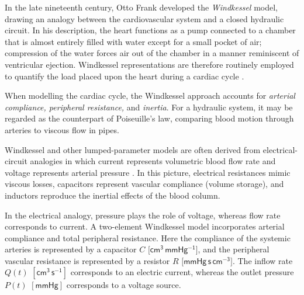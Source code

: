 \documentclass[alpha-refs, 12pt]{wiley-article}
\begin{document}
In the late nineteenth century, Otto Frank developed the \emph{Windkessel} model, drawing an analogy between the cardiovascular system and a closed hydraulic circuit. In his description, the heart functions as a pump connected to a chamber that is almost entirely filled with water except for a small pocket of air; compression of the water forces air out of the chamber in a manner reminiscent of ventricular ejection. Windkessel representations are therefore routinely employed to quantify the load placed upon the heart during a cardiac cycle \cite{Catanho2012}.

When modelling the cardiac cycle, the Windkessel approach accounts for \emph{arterial compliance, peripheral resistance,} and \emph{inertia}. For a hydraulic system, it may be regarded as the counterpart of Poiseuille's law, comparing blood motion through arteries to viscous flow in pipes.

Windkessel and other lumped-parameter models are often derived from electrical-circuit analogies in which current represents volumetric blood flow rate and voltage represents arterial pressure \cite{Avolio1980, Segers1998, Milisic2004}. In this picture, electrical resistances mimic viscous losses, capacitors represent vascular compliance (volume storage), and inductors reproduce the inertial effects of the blood column.

In the electrical analogy, pressure plays the role of voltage, whereas flow rate corresponds to current.  A two-element Windkessel model incorporates arterial compliance and total peripheral resistance. Here the compliance of the systemic arteries is represented by a capacitor \(\!C\) \(\bigl[\mathsf{cm^{3}\,mmHg^{-1}}\bigr]\), and the peripheral vascular resistance is represented by a resistor \(R\) \(\bigl[\mathsf{mmHg\,s\,cm^{-3}}\bigr]\). The inflow rate \(Q(t)\) \([\mathsf{cm^{3}\,s^{-1}}]\) corresponds to an electric current, whereas the outlet pressure \(P(t)\) \([\mathsf{mmHg}]\) corresponds to a voltage source.
\end{document}

